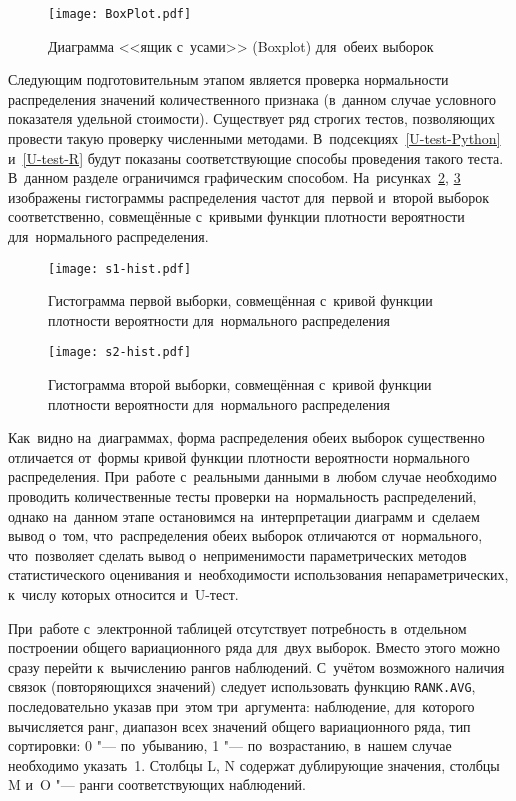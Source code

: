 \documentclass[]{scrartcl}
\begin{document}
%
\begin{figure}[ht]
	\centering
	\texttt{[image: BoxPlot.pdf]}
	\caption{Диаграмма <<ящик с~усами>> (Boxplot) для~обеих выборок }
	\label{fig:BoxPlot}
\end{figure}
%
Следующим подготовительным этапом является проверка нормальности распределения значений количественного признака (в~данном случае условного показателя удельной стоимости). Существует ряд строгих тестов, позволяющих провести такую проверку численными методами. В~подсекциях~\ref{U-test-Python} и~\ref{U-test-R} будут показаны соответствующие способы проведения такого теста. В~данном разделе ограничимся графическим способом. На~рисунках~\ref{fig:s1-hist}, \ref{fig:s2-hist} изображены гистограммы распределения частот для~первой и~второй выборок соответственно, совмещённые с~кривыми функции плотности вероятности для~нормального распределения.
%
\begin{figure}[ht]
	\centering
	\texttt{[image: s1-hist.pdf]}
	\caption{Гистограмма первой выборки, совмещённая с~кривой функции плотности вероятности для~нормального распределения}
	\label{fig:s1-hist}
\end{figure}
%
\begin{figure}[ht]
	\centering
	\texttt{[image: s2-hist.pdf]}
	\caption{Гистограмма второй выборки, совмещённая с~кривой функции плотности вероятности для~нормального распределения}
	\label{fig:s2-hist}
\end{figure}
%

Как~видно на~диаграммах, форма распределения обеих выборок существенно отличается от~формы кривой функции плотности вероятности нормального распределения. При~работе с~реальными данными в~любом случае необходимо проводить количественные тесты проверки на~нормальность распределений, однако на~данном этапе остановимся на~интерпретации диаграмм и~сделаем вывод о~том, что~распределения обеих выборок отличаются от~нормального, что~позволяет сделать вывод о~неприменимости параметрических методов статистического оценивания и~необходимости использования непараметрических, к~числу которых относится и~U-тест.

При~работе с~электронной таблицей отсутствует потребность в~отдельном построении общего вариационного ряда для~двух выборок. Вместо этого можно сразу перейти к~вычислению рангов наблюдений. С~учётом возможного наличия связок (повторяющихся значений) следует использовать функцию \texttt{RANK.AVG}, последовательно указав при~этом три~аргумента: наблюдение, для~которого вычисляется ранг, диапазон всех значений общего вариационного ряда, тип сортировки: 0 "--- по~убыванию, 1 "--- по~возрастанию, в~нашем случае необходимо указать~1. Столбцы L, N содержат дублирующие значения, столбцы M и~O "--- ранги соответствующих наблюдений. 
\end{document}
